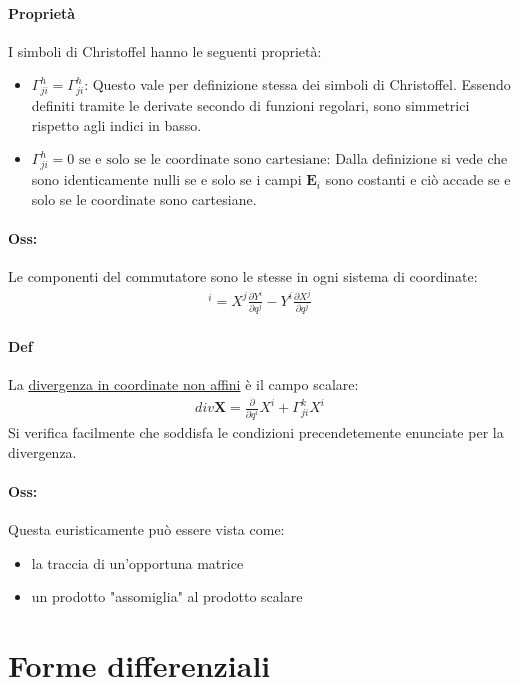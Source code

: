 \documentclass[10pt,a4paper]{book}
\begin{document}
\paragraph{Proprietà} I simboli di Christoffel hanno le seguenti proprietà:
\begin{itemize}
    \item $\boxed{\Gamma^h_{ji}=\Gamma^h_{ji}}$: Questo vale per definizione stessa dei simboli di Christoffel. Essendo definiti tramite le derivate secondo di funzioni regolari, sono simmetrici rispetto agli indici in basso.
    \item $\boxed{\Gamma^h_{ji}=0\text{ se e solo se le coordinate sono cartesiane}}$: Dalla definizione si vede che sono identicamente nulli se e solo se i campi $\mathbf{E}_i$ sono costanti e ciò accade se e solo se le coordinate sono cartesiane.
\end{itemize}
\paragraph{Oss:} Le componenti del commutatore sono le stesse in ogni sistema di coordinate:
\begin{align*}
    [\mathbf{X},\mathbf{Y}]^i=X^j\frac{\partial Y^i}{\partial q^j}-Y^i\frac{\partial X^j}{\partial q^j}
\end{align*}
\paragraph{Def} La \underline{divergenza in coordinate non affini} è il campo scalare:
\begin{align*}
    div\mathbf{X}=\frac{\partial}{\partial q^i}X^i+\Gamma^k_{ji}X^i
\end{align*}
Si verifica facilmente che soddisfa le condizioni precendetemente enunciate per la divergenza.
\paragraph{Oss:} Questa euristicamente può essere vista come:
\begin{itemize}
    \item la traccia di un'opportuna matrice
    \item un prodotto "assomiglia" al prodotto scalare
\end{itemize}

\section{Forme differenziali}
\end{document}
